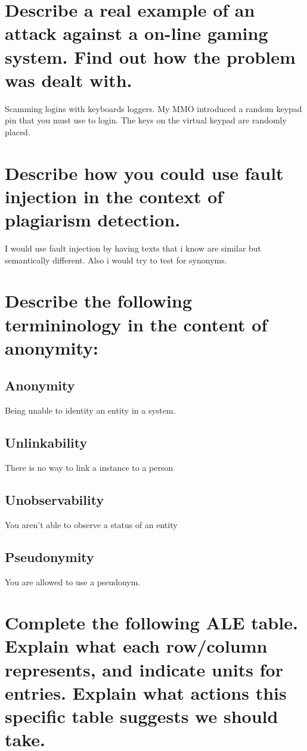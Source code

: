 \documentclass{article}
\begin{document}
\section[Online Gaming]{Describe a real example of an attack against a on-line gaming system. Find out how the problem was dealt with.}
Scamming logins with keyboards loggers. My MMO introduced a random keypad pin that you must use to login. The keys on the virtual keypad are randomly placed. 

\section[Fault Injection]{Describe how you could use fault injection in the context of plagiarism detection.}
I would use fault injection by having texts that i know are similar but semantically different. Also i would try to test for synonyms. 


\section[anonymity terminology]{ Describe the following termininology in the content of anonymity:}

\subsection{Anonymity}
Being unable to identity an entity in a system. 

\subsection{Unlinkability}

There is no way to link a instance to a person
\subsection{Unobservability}

You aren't able to observe a status of an entity

\subsection{Pseudonymity}

You are allowed to use a pseudonym. 

\section[ALE Table]{Complete the following ALE table. Explain what each row/column represents, and indicate units for entries. Explain what actions this specific table suggests we should take.}
\end{document}
